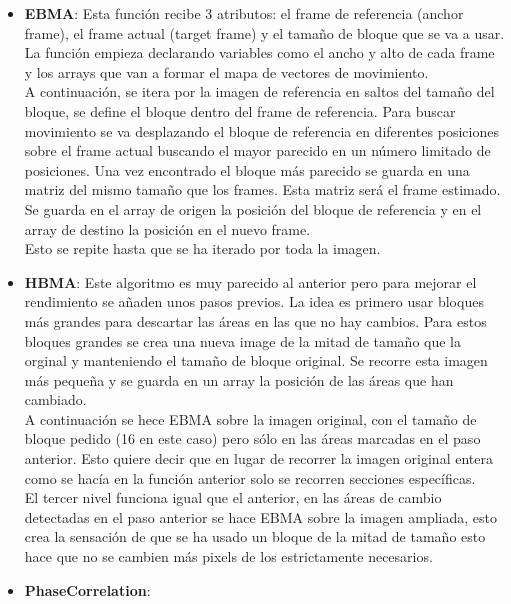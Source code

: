 \documentclass[a4paper,12pt]{report}
\begin{document}
\begin{itemize}
	\item \textbf{EBMA}: Esta función recibe 3 atributos: el frame de referencia (anchor frame), el frame actual (target frame) y el tamaño de bloque que se va a usar. La función empieza declarando variables como el ancho y alto de cada frame y los arrays que van a formar el mapa de vectores de movimiento.\\
 
A continuación, se itera por la imagen de referencia en saltos del tamaño del bloque, se define el bloque dentro del frame de referencia. Para buscar movimiento se va desplazando el bloque de referencia en diferentes posiciones sobre el frame actual buscando el mayor parecido en un número limitado de posiciones. Una vez encontrado el bloque más parecido se guarda en una matriz del mismo tamaño que los frames. Esta matriz será el frame estimado. Se guarda en el array de origen la posición del bloque de referencia y en el array de destino la posición en el nuevo frame.\\
Esto se repite hasta que se ha iterado por toda la imagen.\\

	\item \textbf{HBMA}: Este algoritmo es muy parecido al anterior pero para mejorar el rendimiento se añaden unos pasos previos. La idea es primero usar bloques más grandes para descartar las áreas en las que no hay cambios. Para estos bloques grandes se crea una nueva image de la mitad de tamaño que la orginal y manteniendo el tamaño de bloque original. Se recorre esta imagen más pequeña y se guarda en un array la posición de las áreas que han cambiado.\\

A continuación se hece EBMA sobre la imagen original, con el tamaño de bloque pedido (16 en este caso) pero sólo en las áreas marcadas en el paso anterior. Esto quiere decir que en lugar de recorrer la imagen original entera como se hacía en la función anterior solo se recorren secciones específicas.\\

El tercer nivel funciona igual que el anterior, en las áreas de cambio detectadas en el paso anterior se hace EBMA sobre la imagen ampliada, esto crea la sensación de que se ha usado un bloque de la mitad de tamaño esto hace que no se cambien más pixels de los estrictamente necesarios.\\

	\item \textbf{PhaseCorrelation}: 
\end{itemize}
\end{document}
